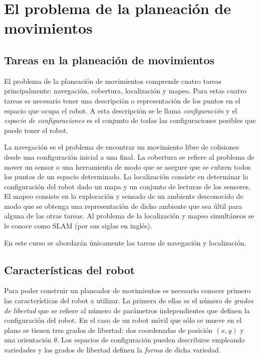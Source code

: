 \documentclass[a4paper]{article}
\begin{document}
\section{El problema de la planeación de movimientos}
\subsection{Tareas en la planeación de movimientos}
\label{sec:Tasks}

El problema de la planeación de movimientos comprende cuatro tareas principalmente: navegación, cobertura, localización y mapeo. 
Para estas cuatro tareas es necesario tener una descripción o representación de los puntos en el espacio que ocupa el robot. A esta descripción se le llama \textit{configuración} y el \textit{espacio de configuraciones} es el conjunto de todas las configuraciones posibles que puede tener el robot.

La navegación es el problema de encontrar un movimiento libre de colisiones desde una configuración inicial a una final. La cobertura se refiere al problema de mover un sensor o una herramienta de modo que se asegure que se cubren todos los puntos de un espacio determinado. La localización consiste en determinar la configuración del robot dado un mapa y un conjunto de lecturas de los sensores. El mapeo consiste en la exploración y sensado de un ambiente desconocido de modo que se obtenga una representación de dicho ambiente que sea últil para alguna de las otras tareas. Al problema de la localización y mapeo simultáneos se le conoce como SLAM (por sus siglas en inglés). 

En este curso se abordarán únicamente las tareas de navegación y localización. 

\subsection{Características del robot}
Para poder construir un planeador de movimientos es necesario conocer primero las características del robot a utilizar. La primera de ellas es el número de \textit{grados de libertad} que se refiere al número de parámetros independientes que definen la configuración del robot. En el caso de un robot móvil que sólo se mueve en el plano se tienen tres grados de libertad: dos coordenadas de posición $(x,y)$ y una orientación $\theta$. Los espacios de configuración pueden describirse empleando variedades y los grados de libertad definen la \textit{forma} de dicha variedad.
\end{document}

